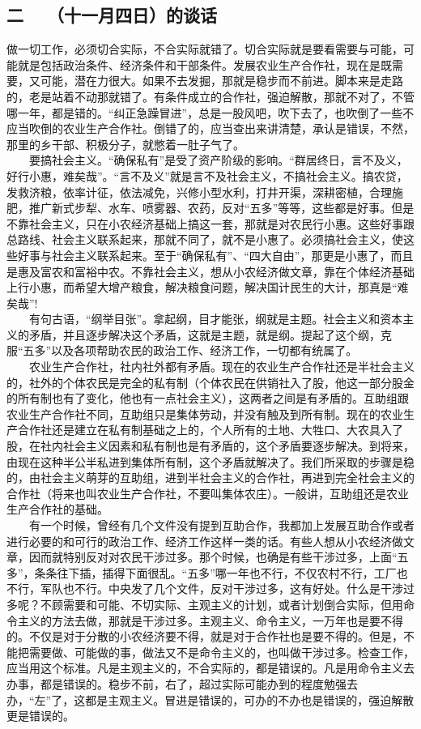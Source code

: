 \documentclass[cn,11pt,chinese]{elegantbook}
\def\myformat#1{\hfil\hfil #1}
\begin{document}
\subsection*{\myformat{二　 （十一月四日）的谈话}}
做一切工作，必须切合实际，不合实际就错了。切合实际就是要看需要与可能，可能就是包括政治条件、经济条件和干部条件。发展农业生产合作社，现在是既需要，又可能，潜在力很大。如果不去发掘，那就是稳步而不前进。脚本来是走路的，老是站着不动那就错了。有条件成立的合作社，强迫解散，那就不对了，不管哪一年，都是错的。“纠正急躁冒进”，总是一股风吧，吹下去了，也吹倒了一些不应当吹倒的农业生产合作社。倒错了的，应当查出来讲清楚，承认是错误，不然，那里的乡干部、积极分子，就憋着一肚子气了。\\
　　要搞社会主义。“确保私有”是受了资产阶级的影响。“群居终日，言不及义，好行小惠，难矣哉”。“言不及义”就是言不及社会主义，不搞社会主义。搞农贷，发救济粮，依率计征，依法减免，兴修小型水利，打井开渠，深耕密植，合理施肥，推广新式步犁、水车、喷雾器、农药，反对“五多”等等，这些都是好事。但是不靠社会主义，只在小农经济基础上搞这一套，那就是对农民行小惠。这些好事跟总路线、社会主义联系起来，那就不同了，就不是小惠了。必须搞社会主义，使这些好事与社会主义联系起来。至于“确保私有”、“四大自由”，那更是小惠了，而且是惠及富农和富裕中农。不靠社会主义，想从小农经济做文章，靠在个体经济基础上行小惠，而希望大增产粮食，解决粮食问题，解决国计民生的大计，那真是“难矣哉”!\\
　　有句古语，“纲举目张”。拿起纲，目才能张，纲就是主题。社会主义和资本主义的矛盾，并且逐步解决这个矛盾，这就是主题，就是纲。提起了这个纲，克服“五多”以及各项帮助农民的政治工作、经济工作，一切都有统属了。\\
　　农业生产合作社，社内社外都有矛盾。现在的农业生产合作社还是半社会主义的，社外的个体农民是完全的私有制（个体农民在供销社入了股，他这一部分股金的所有制也有了变化，他也有一点社会主义），这两者之间是有矛盾的。互助组跟农业生产合作社不同，互助组只是集体劳动，并没有触及到所有制。现在的农业生产合作社还是建立在私有制基础之上的，个人所有的土地、大牲口、大农具入了股，在社内社会主义因素和私有制也是有矛盾的，这个矛盾要逐步解决。到将来，由现在这种半公半私进到集体所有制，这个矛盾就解决了。我们所采取的步骤是稳的，由社会主义萌芽的互助组，进到半社会主义的合作社，再进到完全社会主义的合作社（将来也叫农业生产合作社，不要叫集体农庄）。一般讲，互助组还是农业生产合作社的基础。\\
　　有一个时候，曾经有几个文件没有提到互助合作，我都加上发展互助合作或者进行必要的和可行的政治工作、经济工作这样一类的话。有些人想从小农经济做文章，因而就特别反对对农民干涉过多。那个时候，也确是有些干涉过多，上面“五多”，条条往下插，插得下面很乱。“五多”哪一年也不行，不仅农村不行，工厂也不行，军队也不行。中央发了几个文件，反对干涉过多，这有好处。什么是干涉过多呢？不顾需要和可能、不切实际、主观主义的计划，或者计划倒合实际，但用命令主义的方法去做，那就是干涉过多。主观主义、命令主义，一万年也是要不得的。不仅是对于分散的小农经济要不得，就是对于合作社也是要不得的。但是，不能把需要做、可能做的事，做法又不是命令主义的，也叫做干涉过多。检查工作，应当用这个标准。凡是主观主义的，不合实际的，都是错误的。凡是用命令主义去办事，都是错误的。稳步不前，右了，超过实际可能办到的程度勉强去办，“左”了，这都是主观主义。冒进是错误的，可办的不办也是错误的，强迫解散更是错误的。\\
\end{document}
